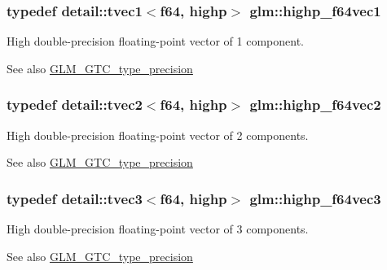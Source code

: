 \subsubsection[{\texorpdfstring{highp\+\_\+f64vec1}{highp_f64vec1}}]{\setlength{\rightskip}{0pt plus 5cm}typedef detail\+::tvec1$<$f64, highp$>$ {\bf glm\+::highp\+\_\+f64vec1}}\hypertarget{group__gtc__type__precision_ga1054b4e4da2b907b35e1806bd6fbaef1}{}\label{group__gtc__type__precision_ga1054b4e4da2b907b35e1806bd6fbaef1}
High double-\/precision floating-\/point vector of 1 component. \begin{DoxySeeAlso}{See also}
\hyperlink{group__gtc__type__precision}{G\+L\+M\+\_\+\+G\+T\+C\+\_\+type\+\_\+precision} 
\end{DoxySeeAlso}
\subsubsection[{\texorpdfstring{highp\+\_\+f64vec2}{highp_f64vec2}}]{\setlength{\rightskip}{0pt plus 5cm}typedef detail\+::tvec2$<$f64, highp$>$ {\bf glm\+::highp\+\_\+f64vec2}}\hypertarget{group__gtc__type__precision_ga1efd4982eaeafae59ce40deb89e018e7}{}\label{group__gtc__type__precision_ga1efd4982eaeafae59ce40deb89e018e7}
High double-\/precision floating-\/point vector of 2 components. \begin{DoxySeeAlso}{See also}
\hyperlink{group__gtc__type__precision}{G\+L\+M\+\_\+\+G\+T\+C\+\_\+type\+\_\+precision} 
\end{DoxySeeAlso}
\subsubsection[{\texorpdfstring{highp\+\_\+f64vec3}{highp_f64vec3}}]{\setlength{\rightskip}{0pt plus 5cm}typedef detail\+::tvec3$<$f64, highp$>$ {\bf glm\+::highp\+\_\+f64vec3}}\hypertarget{group__gtc__type__precision_ga93cbac95bb9106fe15c987c0f56ae679}{}\label{group__gtc__type__precision_ga93cbac95bb9106fe15c987c0f56ae679}
High double-\/precision floating-\/point vector of 3 components. \begin{DoxySeeAlso}{See also}
\hyperlink{group__gtc__type__precision}{G\+L\+M\+\_\+\+G\+T\+C\+\_\+type\+\_\+precision} 
\end{DoxySeeAlso}
